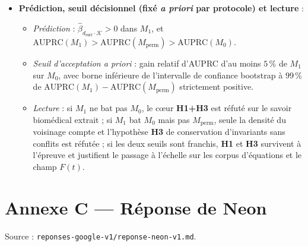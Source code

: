 \documentclass[a4paper,11pt]{article}
\providecommand{\tightlist}{\setlength{\itemsep}{0pt}\setlength{\parskip}{0pt}}
\begin{document}
\begin{itemize}
  \begin{itemize}
  \tightlist
  \item
    \(M_0\) (Surface + H2) : fréquences marginales, attachement
    préférentiel, score ABC de Swanson, \(d_{\text{surf}}\) et
    \(d_{\text{surf}}^2\).
  \item
    \(M_1\) (H1 + H3) :
    \(M_0 + \mathcal{K} + d_{\text{surf}} \cdot \mathcal{K}\).
  \item
    \(M_{\text{perm}}\) (Contrôle de serrure-clé) : identique à \(M_1\),
    mais où \(\mathcal{K}\) est recalculé après permutation aléatoire
    des étiquettes causales (\emph{STIMULATES} \(\leftrightarrow\)
    \emph{INHIBITS}) à topologie de graphe inchangée.
  \end{itemize}
\item
  \textbf{Prédiction, seuil décisionnel (fixé \emph{a priori} par
  protocole) et lecture} :

  \begin{itemize}
  \tightlist
  \item
    \emph{Prédiction} :
    \(\hat{\beta}_{d_{\text{surf}} \cdot \mathcal{K}} > 0\) dans
    \(M_1\), et
    \(\text{AUPRC}(M_1) > \text{AUPRC}(M_{\text{perm}}) > \text{AUPRC}(M_0)\).
  \item
    \emph{Seuil d'acceptation a priori} : gain relatif d'AUPRC d'au
    moins \(5\,\%\) de \(M_1\) sur \(M_0\), avec borne inférieure de
    l'intervalle de confiance bootstrap à \(99\,\%\) de
    \(\text{AUPRC}(M_1) - \text{AUPRC}(M_{\text{perm}})\) strictement
    positive.
  \item
    \emph{Lecture} : si \(M_1\) ne bat pas \(M_0\), le cœur
    \textbf{H1+H3} est réfuté sur le savoir biomédical extrait ; si
    \(M_1\) bat \(M_0\) mais pas \(M_{\text{perm}}\), seule la densité
    du voisinage compte et l'hypothèse \textbf{H3} de conservation
    d'invariants sans conflits est réfutée ; si les deux seuils sont
    franchis, \textbf{H1} et \textbf{H3} survivent à l'épreuve et
    justifient le passage à l'échelle sur les corpus d'équations et le
    champ \(F(t)\).
  \end{itemize}
\end{itemize}
\clearpage
\section*{Annexe C — Réponse de Neon}
{\small Source : \texttt{reponses-google-v1/reponse-neon-v1.md}.}\par
\end{document}
